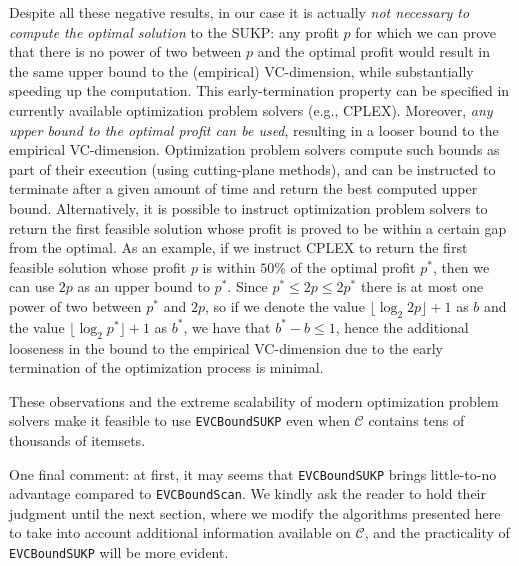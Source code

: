 Despite all these negative results, in our case it is actually \emph{not
necessary to compute the optimal solution} to the SUKP: any profit $p$ for which
we can prove that there is no power of two between $p$ and the optimal profit
would result in the same upper bound to the (empirical) VC-dimension, while
substantially speeding up the computation. This early-termination property can
be specified in currently available optimization problem solvers (e.g., CPLEX).
Moreover, \emph{any upper bound to the optimal profit can be used}, resulting in
a looser bound to the empirical VC-dimension. Optimization problem solvers
compute such bounds as part of their execution (using cutting-plane methods),
and can be instructed to terminate after a given amount of time and return the
best computed upper bound. Alternatively, it is possible to instruct
optimization problem solvers to return the first feasible solution whose profit
is proved to be within a certain gap from the optimal. As an example, if we
instruct CPLEX to return the first feasible solution whose profit $p$ is within
$50\%$ of the optimal profit $p^*$, then we can use $2p$ as an upper bound to
$p^*$. Since $p^*\le 2p\le 2p^*$ there is at most one power of two between $p^*$
and $2p$, so if we denote the value $\lfloor\log_2 2p\rfloor +1$ as $b$ and the
value $\lfloor\log_2 p^*\rfloor +1$ as $b^*$, we have that $b^*-b\le 1$, hence
the additional looseness in the bound to the empirical VC-dimension due to the
early termination of the optimization process is minimal.

These observations and the extreme scalability of modern optimization problem
solvers make it feasible to use \texttt{EVCBoundSUKP} even when $\mathcal{C}$
contains tens of thousands of itemsets.

One final comment: at first, it may seems that \texttt{EVCBoundSUKP} brings
little-to-no advantage compared to \texttt{EVCBoundScan}. We kindly ask the
reader to hold their judgment until the next section, where we modify the
algorithms presented here to take into account additional information available
on $\mathcal{C}$, and the practicality of \texttt{EVCBoundSUKP} will be more
evident.
